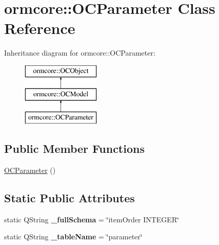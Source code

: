 \hypertarget{classormcore_1_1_o_c_parameter}{
\section{ormcore\-:\-:\-O\-C\-Parameter \-Class \-Reference}
\label{classormcore_1_1_o_c_parameter}
}
\-Inheritance diagram for ormcore\-:\-:\-O\-C\-Parameter\-:\begin{figure}[H]
\begin{center}
\leavevmode
\includegraphics[height=3.000000cm]{classormcore_1_1_o_c_parameter}
\end{center}
\end{figure}
\subsection*{\-Public \-Member \-Functions}
\begin{DoxyCompactItemize}
\item 
\hyperlink{classormcore_1_1_o_c_parameter_a4c009b883c11052314c288620615da43}{\-O\-C\-Parameter} ()
\end{DoxyCompactItemize}
\subsection*{\-Static \-Public \-Attributes}
\begin{DoxyCompactItemize}
\item 
\hypertarget{classormcore_1_1_o_c_parameter_a4328bfaee523058a71bbb44f0f134093}{
static \-Q\-String {\bfseries \-\_\-full\-Schema} = \char`\"{}item\-Order \-I\-N\-T\-E\-G\-E\-R\char`\"{}}
\label{classormcore_1_1_o_c_parameter_a4328bfaee523058a71bbb44f0f134093}

\item 
\hypertarget{classormcore_1_1_o_c_parameter_ac782f4af1a6ed5345a9f9fd30f5e0efb}{
static \-Q\-String {\bfseries \-\_\-table\-Name} = \char`\"{}parameter\char`\"{}}
\label{classormcore_1_1_o_c_parameter_ac782f4af1a6ed5345a9f9fd30f5e0efb}

\end{DoxyCompactItemize}


